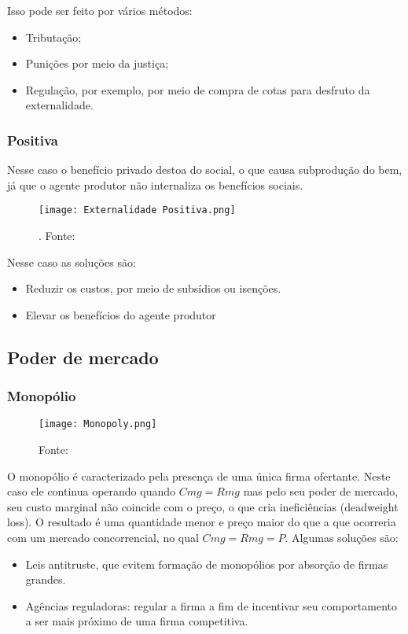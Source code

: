 \documentclass[12pt,a4paper,oneside,brazil]{abntex2}
\begin{document}
Isso pode ser feito por vários métodos:
\begin{itemize}
\item Tributação;
\item Punições por meio da justiça;
\item  Regulação, por exemplo, por meio de compra de cotas para desfruto da externalidade.
\end{itemize}
\subsubsection{Positiva}
Nesse caso o benefício privado destoa do social, o que causa subprodução do bem, já que o agente produtor não internaliza os benefícios sociais.
\begin{figure}[ht]
\texttt{[image: Externalidade Positiva.png]}
\centering
\caption{. Fonte: \cite{biderman}}
\end{figure}
Nesse caso as soluções são:
\begin{itemize}
\item Reduzir os custos, por meio de subsídios ou isenções.
\item Elevar os benefícios do agente produtor
\end{itemize}

\subsection{Poder de mercado}
\subsubsection{Monopólio}
\begin{wrapfigure}{l}{0.5\textwidth}
	\texttt{[image: Monopoly.png]}
	\centering
	\caption{Fonte: \cite{nicholson}}
\end{wrapfigure}
O monopólio é caracterizado pela presença de uma única firma ofertante. Neste caso ele continua operando quando $Cmg = Rmg$ mas pelo seu poder de mercado, seu custo marginal não coincide com o preço, o que cria ineficiências (deadweight loss). O resultado é uma quantidade menor e preço maior do que a que ocorreria com um mercado concorrencial, no qual $Cmg = Rmg = P$.
\clearpage
 Algumas soluções são:
\begin{itemize}
\item Leis antitruste, que evitem formação de monopólios por absorção de firmas grandes.
\item Agências reguladoras: regular a firma a fim de incentivar seu comportamento a ser mais próximo de uma firma competitiva.
\end{itemize}
\end{document}
